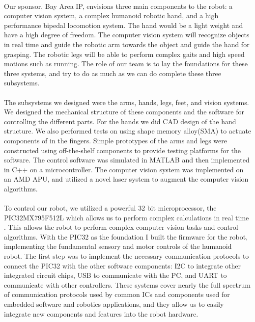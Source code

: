 \documentclass[titlepage,letterpaper,12pt]{article}
\begin{document}
\paragraph{}Our sponsor, Bay Area IP, envisions three main components to the
robot: a computer vision system, a complex humanoid robotic hand, and a high
performance bipedal locomotion system. The hand would be a light weight and have
a high degree of freedom. The computer vision system will recognize objects in
real time and guide the robotic arm towards the object and guide the hand for
grasping. The robotic legs will be able to perform complex gaits and high speed
motions such as running. The role of our team is to lay the foundations for
these three systems, and try to do as much as we can do complete these three
subsystems.

\paragraph{}The subsystems we designed were the arms, hands, legs, feet, and
vision systems.  We designed the mechanical structure of these components and
the software for controlling the different parts. For the hands we did CAD
design of the hand structure. We also performed tests on using shape memory
alloy(SMA) to actuate components of in the fingers. Simple prototypes of the
arms and legs were constructed using off-the-shelf components to provide testing
platforms for the software. The control software was simulated in MATLAB and
then implemented in C++ on a microcontroller. The computer vision system was
implemented on an AMD APU, and utilized a novel laser system to augment the
computer vision algorithms.

\paragraph{}To control our robot, we utilized a powerful 32 bit microprocessor,
the PIC32MX795F512L which allows us to perform complex calculations in real time
\cite{pic32data}. This allows the robot to perform complex computer vision tasks
and control algorithms. With the PIC32 as the foundation I built the firmware
for the robot, implementing the fundamental sensory and motor controls of the
humanoid robot. The first step was to implement the necessary communication
protocols to connect the PIC32 with the other software components: I2C to
integrate other integrated circuit chips, USB to communicate with the PC, and
UART to communicate with other controllers. These systems cover nearly the full
spectrum of communication protocols used by common ICs and components used for
embedded software and robotics applications, and they allow us to easily
integrate new components and features into the robot hardware.
\end{document}
